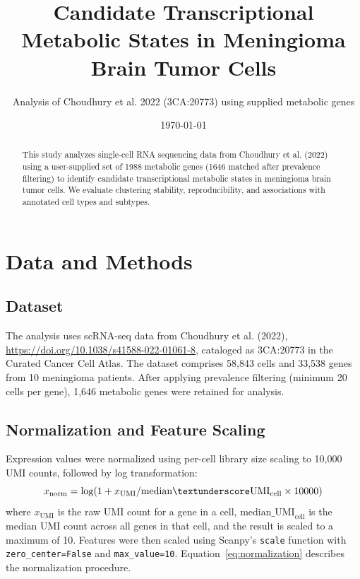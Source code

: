 \documentclass[11pt,a4paper]{article}
\title{Candidate Transcriptional Metabolic States in Meningioma Brain Tumor Cells}
\author{Analysis of Choudhury et al. 2022 (3CA:20773) using supplied metabolic genes}
\date{\today}
\begin{document}
\sloppy

\maketitle

\begin{abstract}
This study analyzes single-cell RNA sequencing data from Choudhury et al. (2022) using a user-supplied set of 1988 metabolic genes (1646 matched after prevalence filtering) to identify candidate transcriptional metabolic states in meningioma brain tumor cells. We evaluate clustering stability, reproducibility, and associations with annotated cell types and subtypes.
\end{abstract}

\section{Data and Methods}

\subsection{Dataset}
The analysis uses scRNA-seq data from Choudhury et al. (2022), \url{https://doi.org/10.1038/s41588-022-01061-8}, cataloged as 3CA:20773 in the Curated Cancer Cell Atlas. The dataset comprises 58,843 cells and 33,538 genes from 10 meningioma patients. After applying prevalence filtering (minimum 20 cells per gene), 1,646 metabolic genes were retained for analysis.

\subsection{Normalization and Feature Scaling}
Expression values were normalized using per-cell library size scaling to 10,000 UMI counts, followed by log transformation:
\begin{equation}
\label{eq:normalization}
x_{\text{norm}} = \log(1 + x_{\text{UMI}} / \text{median}\textunderscore\text{UMI}_{\text{cell}} \times 10000)
\end{equation}
where $x_{\text{UMI}}$ is the raw UMI count for a gene in a cell, $\text{median\_UMI}_{\text{cell}}$ is the median UMI count across all genes in that cell, and the result is scaled to a maximum of 10. Features were then scaled using Scanpy's \texttt{scale} function with \texttt{zero\_center=False} and \texttt{max\_value=10}. Equation~\ref{eq:normalization} describes the normalization procedure.
\end{document}
